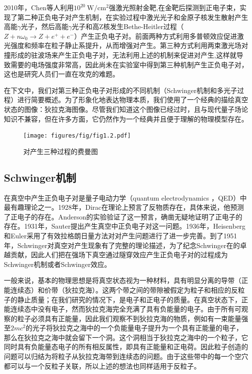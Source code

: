 2010年，Chen等人利用$10^{20}~\mathrm{W/cm^{2}}$强激光照射金靶,在金靶后探测到正电子束\cite{2010BH}，实现了第二种正负电子对产生机制，在实验过程中激光光子和金原子核发生散射产生高能$\gamma$光子，然后高能$\gamma$光子和高Z核发生Bethe-Heitler过程（$Z+n \omega_{0} \rightarrow Z+e^{+}+e^{-}$）产生正负电子对。前面两种方式利用多普顿效应促进激光强度和频率在粒子静止系提升，从而增强对产生。第三种方式利用两束激光场对撞形成的驻波场来产生正负电子对，无法利用上述的机制来促进对产生,这样就导致需要的电场强度非常高，因此尚未在实验室中得到第三种机制产生正负电子对，这也是研究人员们一直在攻克的难题。

在下文中，我们对第三种正负电子对形成的不同机制（Schwinger机制和多光子过程）进行简要概述。为了形象化地表达物理本质，我们使用了一个经典的描绘真空状态的图像：狄拉克海图像。尽管我们知道这个图像已经过时，且与现代量子场论知识不兼容，但在许多方面，它仍然作为一个经典并且便于理解的物理模型存在。

\begin{figure}
  \centering
  \texttt{[image: figures/fig/fig1.2.pdf]}
  \caption{对产生三种过程的费曼图}
  \label{tu2}
\end{figure}

\subsection{Schwinger机制}

在真空中产生正负电子对是量子电动力学（quantum electrodynamics ，QED）中最有趣理论之一。1928年，Dirac在理论上预言了反物质存在\cite{1928s}，具体来说，他预测了正电子的存在。Anderson的实验验证了这一预言，确凿无疑地证明了正电子的存在\cite{1933s}。1931年，Sauter提出产生真空中正负电子对这一问题\cite{1931s}。1936年，Heisenberg和Euler采用了有效拉格朗日量方法对对产生问题进行了进一步完善\cite{1936s}。到了1951年，Schwinger对真空对产生现象有了完整的理论描述\cite{1951s}，为了纪念Schwinger在的卓越贡献，因此人们把在强场下真空通过隧穿效应产生正负电子对的过程成为Schwinger机制或者Schwinger效应。

一般来说，基本的物理思想是将真空状态视为一种材料，具有明显分离的导带（正能连续态）和价带（狄拉克海）。这两个带之间的带隙被假定为粒子和相应的反粒子的静止质量；在我们研究的情况下，是电子和正电子的质量。在真空状态下，正能连续态中没有电子，然而狄拉克海完全充满了具有负能量的电子。由于所有可观察的粒子必须具有正能量，因此我们观察不到狄拉克海的物质，例如有一束能量强至$2m c^{2}$的光子将狄拉克之海中的一个负能量电子提升为一个具有正能量的电子，那么在狄拉克之海中就会留下一个洞。这个洞相当于狄拉克之海中的一个粒子，它同时具有负能量态电子的所有相反属性，即具有正能量和正电荷。因此粒子创造的问题可以归结为将粒子从狄拉克海带到连续态的问题。由于这些带中的每一个空穴都可以与一个反粒子关联，所以上述的想法也同样适用于反粒子。

